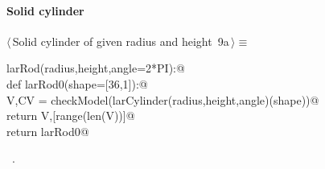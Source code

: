 \documentclass[11pt,oneside]{article}	%
\begin{document}
\paragraph{Solid cylinder}
\begin{flushleft} \small \label{scrap17}
\protect{}$\langle\,$Solid cylinder of given radius and height\nobreak\ {\footnotesize 9a}$\,\rangle\equiv$
\vspace{-1ex}
\begin{list}{}{} \item
\mbox{}\verb@def larRod(radius,height,angle=2*PI):@\\
\mbox{}\verb@   def larRod0(shape=[36,1]):@\\
\mbox{}\verb@      V,CV = checkModel(larCylinder(radius,height,angle)(shape))@\\
\mbox{}\verb@      return V,[range(len(V))]@\\
\mbox{}\verb@   return larRod0@\\
\mbox{}\verb@@{\NWsep}
\end{list}
\vspace{-1ex}
\footnotesize\addtolength{\baselineskip}{-1ex}
\begin{list}{}{\setlength{\itemsep}{-\parsep}\setlength{\itemindent}{-\leftmargin}}
\item \NWtxtMacroRefIn\ .
\end{list}
\end{flushleft}
\end{document}
